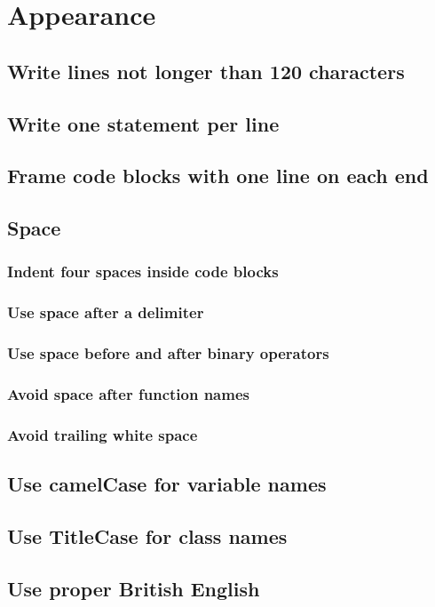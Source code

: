 \documentclass[a4paper,11pt]{scrreprt}
\begin{document}
\chapter{Appearance}
\section{Write lines not longer than 120 characters}
\section{Write one statement per line}
\section{Frame code blocks with one line on each end}
\section{Space}
\subsection{Indent four spaces inside code blocks}
\subsection{Use space after a delimiter}
\subsection{Use space before and after binary operators}
\subsection{Avoid space after function names}
\subsection{Avoid trailing white space}
\section{Use camelCase for variable names}
\section{Use TitleCase for class names}
\section{Use proper British English}
\end{document}
